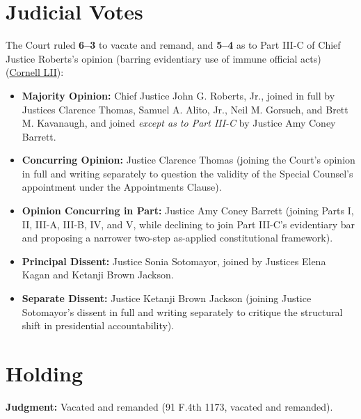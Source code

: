 \documentclass[12pt]{article}
\begin{document}
\section{Judicial Votes}

The Court ruled \textbf{6--3} to vacate and remand, and \textbf{5--4} as to Part III-C of Chief Justice Roberts's opinion (barring evidentiary use of immune official acts) (\href{https://www.law.cornell.edu/supremecourt/text/23-939}{Cornell LII}):
\begin{itemize}
\item \textbf{Majority Opinion:} Chief Justice John G. Roberts, Jr., joined in full by Justices Clarence Thomas, Samuel A. Alito, Jr., Neil M. Gorsuch, and Brett M. Kavanaugh, and joined \emph{except as to Part III-C} by Justice Amy Coney Barrett.
\item \textbf{Concurring Opinion:} Justice Clarence Thomas (joining the Court's opinion in full and writing separately to question the validity of the Special Counsel's appointment under the Appointments Clause).
\item \textbf{Opinion Concurring in Part:} Justice Amy Coney Barrett (joining Parts I, II, III-A, III-B, IV, and V, while declining to join Part III-C's evidentiary bar and proposing a narrower two-step as-applied constitutional framework).
\item \textbf{Principal Dissent:} Justice Sonia Sotomayor, joined by Justices Elena Kagan and Ketanji Brown Jackson.
\item \textbf{Separate Dissent:} Justice Ketanji Brown Jackson (joining Justice Sotomayor's dissent in full and writing separately to critique the structural shift in presidential accountability).
\end{itemize}

\section{Holding}

\textbf{Judgment:} Vacated and remanded (91 F.4th 1173, vacated and remanded).
\end{document}

